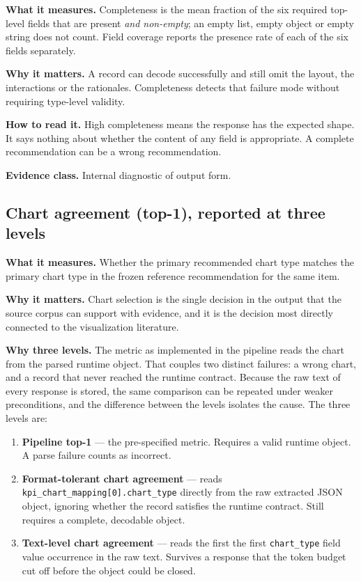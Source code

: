 \textbf{What it measures.} Completeness is the mean fraction of the six required top-level fields that are present \emph{and non-empty}; an empty list, empty object or empty string does not count. Field coverage reports the presence rate of each of the six fields separately.

\textbf{Why it matters.} A record can decode successfully and still omit the layout, the interactions or the rationales. Completeness detects that failure mode without requiring type-level validity.

\textbf{How to read it.} High completeness means the response has the expected shape. It says nothing about whether the content of any field is appropriate. A complete recommendation can be a wrong recommendation.

\textbf{Evidence class.} Internal diagnostic of output form.

\subsection{Chart agreement (top-1), reported at three levels}

\textbf{What it measures.} Whether the primary recommended chart type matches the primary chart type in the frozen reference recommendation for the same item.

\textbf{Why it matters.} Chart selection is the single decision in the output that the source corpus can support with evidence, and it is the decision most directly connected to the visualization literature.

\textbf{Why three levels.} The metric as implemented in the pipeline reads the chart from the parsed runtime object. That couples two distinct failures: a wrong chart, and a record that never reached the runtime contract. Because the raw text of every response is stored, the same comparison can be repeated under weaker preconditions, and the difference between the levels isolates the cause. The three levels are:

\begin{enumerate}
\def\labelenumi{\arabic{enumi}.}
\tightlist
\item
  \textbf{Pipeline top-1} --- the pre-specified metric. Requires a valid runtime object. A parse failure counts as incorrect.
\item
  \textbf{Format-tolerant chart agreement} --- reads \nolinkurl{kpi_chart_mapping[0].chart_type} directly from the raw extracted JSON object, ignoring whether the record satisfies the runtime contract. Still requires a complete, decodable object.
\item
  \textbf{Text-level chart agreement} --- reads the first the first \texttt{chart\_type} field value occurrence in the raw text. Survives a response that the token budget cut off before the object could be closed.
\end{enumerate}

